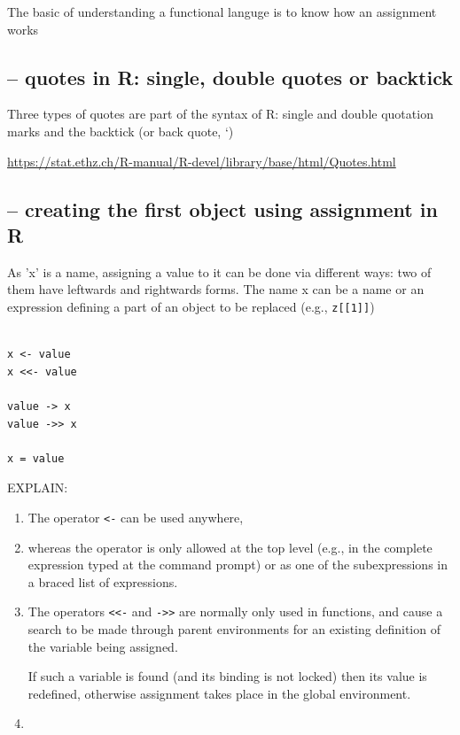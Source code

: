 The basic of understanding a functional languge is to know how an assignment works

\subsection{-- quotes in R: single, double quotes or backtick}


Three types of quotes are part of the syntax of R: single and double quotation
marks and the backtick (or back quote, `)

\url{https://stat.ethz.ch/R-manual/R-devel/library/base/html/Quotes.html}

\subsection{-- creating the first object using assignment in R}

As 'x' is a name, assigning a value to it can be done via different ways:
two of them have leftwards and rightwards forms.
The name x can be a name or an expression defining a part of an object to be
replaced (e.g., \verb!z[[1]]!)

\begin{verbatim}

x <- value
x <<- value

value -> x
value ->> x

x = value
\end{verbatim}

EXPLAIN:
\begin{enumerate}
  \item  The operator \verb!<-! can be used anywhere, 
  
  \item whereas the operator \verb!! is only allowed at the top level 
  (e.g., in the complete expression typed at the command prompt) or as one of the subexpressions in a braced list of expressions.
  
  \item The operators \verb!<<-! and \verb!->>! are normally only used in
  functions, and cause a search to be made through parent environments for an
  existing definition of the variable being assigned.
  
  If such a variable is found (and its binding is not locked) then its value is
  redefined, otherwise assignment takes place in the global environment.
  
  \item 
  
\end{enumerate}

